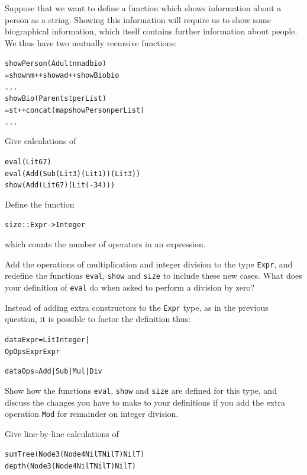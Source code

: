 Suppose that we want to define a function which shows information about a person as
a string. Showing this information will require us to show some biographical
information, which itself contains further information about people. We thus have two
mutually recursive functions:
\begin{alltt}
showPerson (Adult nm ad bio) 
  = show nm ++ show ad ++ showBio bio
  ...
showBio (Parent st perList)
  = st ++ concat (map showPerson perList)
  ...
\end{alltt}
\begin{exercises}

\item
Give calculations of 
\begin{alltt}
eval (Lit 67)
eval (Add (Sub (Lit 3) (Lit 1)) (Lit 3))
show (Add (Lit 67) (Lit (-34)))
\end{alltt}

\item
Define the function
\begin{alltt}
size :: Expr -> Integer
\end{alltt}
which counts the number of operators in an expression.

\item
Add the operations of multiplication and integer division to the type 
\texttt{Expr}, and redefine the functions \texttt{eval}, \texttt{show} and \texttt{size}
to include these new cases. What does your definition of \texttt{eval} do when
asked to perform a division by zero?

\item
Instead of adding extra constructors to the \texttt{Expr} type, as in the
previous question, it is possible to factor the definition thus:

\label{modExpr}\begin{alltt}
data Expr = Lit Integer |
            Op Ops Expr Expr

data Ops  = Add | Sub | Mul | Div 
\end{alltt}
Show how the functions \texttt{eval}, \texttt{show} and \texttt{size} are defined
for this type, and discuss the changes you have to make to your definitions if
you add the extra operation \texttt{Mod} for remainder on integer division.

\item
Give line-by-line calculations of 
\begin{alltt}
sumTree (Node 3 (Node 4 NilT NilT) NilT)
depth   (Node 3 (Node 4 NilT NilT) NilT)
\end{alltt}


\end{exercises}
